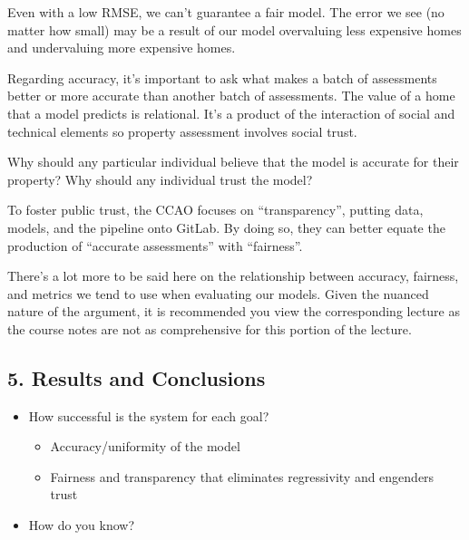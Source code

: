 \documentclass[
  letterpaper,
  DIV=11,
  numbers=noendperiod]{scrreprt}
\providecommand{\tightlist}{%
  \setlength{\itemsep}{0pt}\setlength{\parskip}{0pt}}\usepackage{longtable,booktabs,array}
\begin{document}
Even with a low RMSE, we can't guarantee a fair model. The error we see
(no matter how small) may be a result of our model overvaluing less
expensive homes and undervaluing more expensive homes.

Regarding accuracy, it's important to ask what makes a batch of
assessments better or more accurate than another batch of assessments.
The value of a home that a model predicts is relational. It's a product
of the interaction of social and technical elements so property
assessment involves social trust.

Why should any particular individual believe that the model is accurate
for their property? Why should any individual trust the model?

To foster public trust, the CCAO focuses on ``transparency'', putting
data, models, and the pipeline onto GitLab. By doing so, they can better
equate the production of ``accurate assessments'' with ``fairness''.

There's a lot more to be said here on the relationship between accuracy,
fairness, and metrics we tend to use when evaluating our models. Given
the nuanced nature of the argument, it is recommended you view the
corresponding lecture as the course notes are not as comprehensive for
this portion of the lecture.

\subsection{5. Results and Conclusions}\label{results-and-conclusions}

\begin{tcolorbox}[enhanced jigsaw, coltitle=black, leftrule=.75mm, left=2mm, bottomrule=.15mm, bottomtitle=1mm, opacityback=0, breakable, arc=.35mm, opacitybacktitle=0.6, toptitle=1mm, title=\textcolor{quarto-callout-note-color}{\faInfo}\hspace{0.5em}{Driving Questions}, colbacktitle=quarto-callout-note-color!10!white, titlerule=0mm, rightrule=.15mm, colframe=quarto-callout-note-color-frame, toprule=.15mm, colback=white]

\begin{itemize}
\tightlist
\item
  How successful is the system for each goal?

  \begin{itemize}
  \tightlist
  \item
    Accuracy/uniformity of the model
  \item
    Fairness and transparency that eliminates regressivity and engenders
    trust
  \end{itemize}
\item
  How do you know?
\end{itemize}

\end{tcolorbox}
\end{document}
